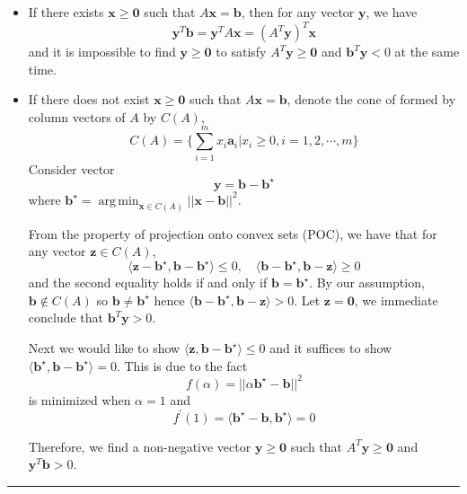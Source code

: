 \documentclass{article}
\DeclareMathOperator*{\argmin}{arg\,min}
\newcommand{\bs}{\boldsymbol}
\newenvironment{proof}{{\bf Proof:}}{\hfill\rule{2mm}{2mm}}
\begin{document}
\begin{proof}
\begin{itemize}
	\item If there exists $\bs{x} \ge \bs{0}$ such that $A\bs{x}=\bs{b}$, then for any vector $\bs{y}$, we have 
	\[ \bs{y}^T\bs{b} = \bs{y}^T A\bs{x}=(A^T \bs{y})^T\bs{x} \]
	and it is impossible to find $\bs{y} \ge \bs{0}$ to satisfy $A^T \bs{y} \ge \bs{0}$ and $\bs{b}^T\bs{y} < 0$ at the same time.
	\item If there does not exist $\bs{x} \ge \bs{0}$ such that $A\bs{x} =\bs{b}$, denote the cone of formed by column vectors of $A$ by $C(A)$, 
	\[ C(A) = \{ \sum_{i=1}^m x_i \bs{a}_i| x_i \ge 0, i=1,2,\cdots, m\}\]
	Consider vector \[\bs{y} = \bs{b} - \bs{b}^\star\] where $\displaystyle \bs{b}^\star = \argmin_{\bs{x} \in C(A)} ||\bs{x} - \bs{b}||^2$.

	From the property of projection onto convex sets (POC), we have that for any vector $\bs{z} \in C(A)$,
	\[  \langle \bs{z} - \bs{b}^\star, \bs{b} - \bs{b}^\star \rangle \le 0, \quad \langle \bs{b} - \bs{b}^\star, \bs{b} - \bs{z}\rangle \ge 0\]
	and the second equality holds if and only if $\bs{b} =\bs{b}^\star$. By our assumption, $\bs{b} \notin C(A)$ so $\bs{b} \neq \bs{b}^\star$ hence $\langle \bs{b} - \bs{b}^\star, \bs{b} - \bs{z}\rangle > 0$. Let $\bs{z} =\bs{0}$, we immediate conclude that $\bs{b}^T\bs{y} > 0$.

	Next we would like to show $\langle \bs{z}, \bs{b} - \bs{b}^\star \rangle \le 0$ and it suffices to show $\langle \bs{b}^\star, \bs{b} - \bs{b}^\star\rangle =0$. This is due to the fact 
	\[ f(\alpha) = ||\alpha \bs{b}^\star - \bs{b}||^2 \]
	is minimized when $\alpha = 1$ and 
	\[f^\prime(1) = \langle \bs{b}^\star-\bs{b}, \bs{b}^\star \rangle = 0\]

	Therefore, we find a non-negative vector $\bs{y} \ge \bs{0}$ such that $A^T\bs{y} \ge \bs{0}$ and $\bs{y}^T\bs{b} > 0$.
\end{itemize}
\end{proof}
\end{document}
